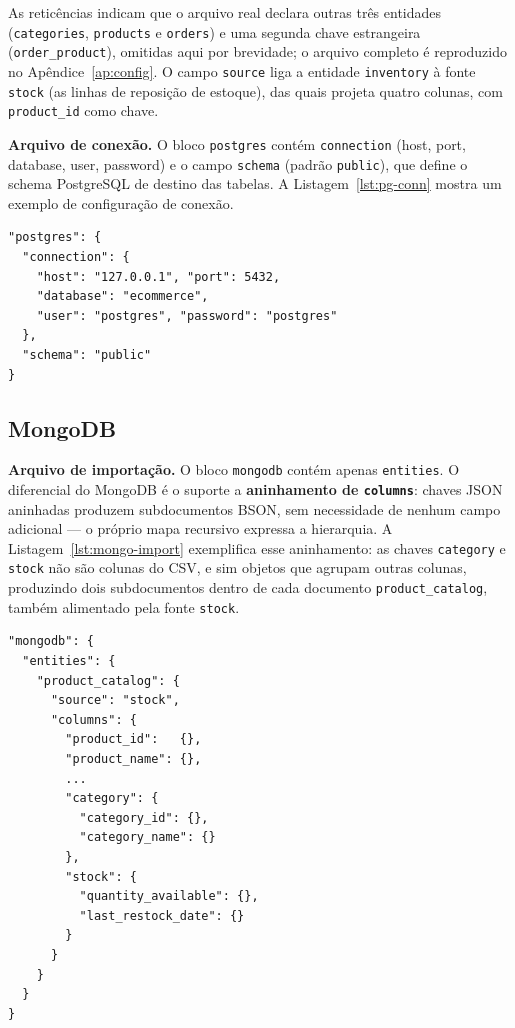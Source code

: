 As reticências indicam que o arquivo real declara outras três entidades
(\texttt{categories}, \texttt{products} e \texttt{orders}) e uma segunda chave
estrangeira (\texttt{order\_product}), omitidas aqui por brevidade; o arquivo
completo é reproduzido no Apêndice~\ref{ap:config}. O campo \texttt{source} liga a
entidade \texttt{inventory} à fonte \texttt{stock} (as linhas de reposição de estoque),
das quais projeta quatro colunas, com \texttt{product\_id} como chave.

\textbf{Arquivo de conexão.} O bloco \texttt{postgres} contém \texttt{connection}
(host, port, database, user, password) e o campo \texttt{schema} (padrão
\texttt{public}), que define o schema PostgreSQL de destino das tabelas. A
Listagem~\ref{lst:pg-conn} mostra um exemplo de configuração de conexão.

\begin{lstlisting}[style=jsonstyle,caption={Fragmento de conexão PostgreSQL.},label={lst:pg-conn}]
"postgres": {
  "connection": {
    "host": "127.0.0.1", "port": 5432,
    "database": "ecommerce",
    "user": "postgres", "password": "postgres"
  },
  "schema": "public"
}
\end{lstlisting}

\subsection{MongoDB}

\textbf{Arquivo de importação.} O bloco \texttt{mongodb} contém apenas
\texttt{entities}. O diferencial do MongoDB é o suporte a
\textbf{aninhamento de \texttt{columns}}: chaves JSON aninhadas produzem subdocumentos
BSON, sem necessidade de nenhum campo adicional --- o próprio mapa recursivo expressa a
hierarquia. A Listagem~\ref{lst:mongo-import} exemplifica esse aninhamento: as chaves
\texttt{category} e \texttt{stock} não são colunas do CSV, e sim objetos que agrupam
outras colunas, produzindo dois subdocumentos dentro de cada documento
\texttt{product\_catalog}, também alimentado pela fonte \texttt{stock}.

\begin{lstlisting}[style=jsonstyle,caption={Fragmento de importação MongoDB com subdocumentos.},label={lst:mongo-import}]
"mongodb": {
  "entities": {
    "product_catalog": {
      "source": "stock",
      "columns": {
        "product_id":   {},
        "product_name": {},
        ...
        "category": {
          "category_id": {},
          "category_name": {}
        },
        "stock": {
          "quantity_available": {},
          "last_restock_date": {}
        }
      }
    }
  }
}
\end{lstlisting}

